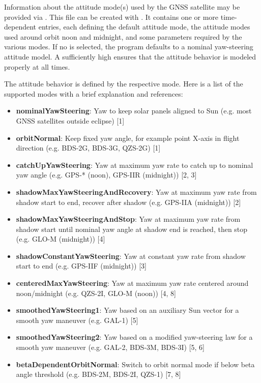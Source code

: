 Information about the attitude mode(s) used by the GNSS satellite may be provided via
. This file can be created with
. It contains one or more time-dependent entries,
each defining the default attitude mode, the attitude modes used around orbit noon and
midnight, and some parameters required by the various modes.
If no  is selected, the program defaults
to a nominal yaw-steering attitude model.
A sufficiently high  ensures that the attitude behavior is modeled properly
at all times.

The attitude behavior is defined by the respective mode. Here is a list of the supported
modes with a brief explanation and references:
\begin{itemize}
\item \textbf{nominalYawSteering}:
      Yaw to keep solar panels aligned to Sun (e.g. most GNSS satellites outside eclipse) [1]
\item \textbf{orbitNormal}:
      Keep fixed yaw angle, for example point X-axis in flight direction (e.g. BDS-2G, BDS-3G, QZS-2G) [1]
\item \textbf{catchUpYawSteering}:
      Yaw at maximum yaw rate to catch up to nominal yaw angle (e.g. GPS-* (noon), GPS-IIR (midnight)) [2, 3]
\item \textbf{shadowMaxYawSteeringAndRecovery}:
      Yaw at maximum yaw rate from shadow start to end, recover after shadow (e.g. GPS-IIA (midnight)) [2]
\item \textbf{shadowMaxYawSteeringAndStop}:
      Yaw at maximum yaw rate from shadow start until nominal yaw angle at shadow end is reached,
      then stop (e.g. GLO-M (midnight)) [4]
\item \textbf{shadowConstantYawSteering}:
      Yaw at constant yaw rate from shadow start to end (e.g. GPS-IIF (midnight)) [3]
\item \textbf{centeredMaxYawSteering}:
      Yaw at maximum yaw rate centered around noon/midnight (e.g. QZS-2I, GLO-M (noon)) [4, 8]
\item \textbf{smoothedYawSteering1}:
      Yaw based on an auxiliary Sun vector for a smooth yaw maneuver (e.g. GAL-1) [5]
\item \textbf{smoothedYawSteering2}:
      Yaw based on a modified yaw-steering law for a smooth yaw maneuver (e.g. GAL-2, BDS-3M, BDS-3I) [5, 6]
\item \textbf{betaDependentOrbitNormal}:
      Switch to orbit normal mode if below beta angle threshold (e.g. BDS-2M, BDS-2I, QZS-1) [7, 8]
\end{itemize}

